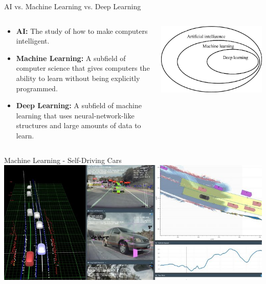 \documentclass[aspectratio=169]{beamer}
\begin{document}
\begin{frame}{AI vs. Machine Learning vs. Deep Learning}

    \begin{columns}
        \begin{column}{0.5\textwidth}
            \begin{itemize}
                \item \textbf{AI:} The study of how to make computers intelligent.
                \item \textbf{Machine Learning:} A subfield of computer science that gives computers the ability to learn without being explicitly programmed.
                \item \textbf{Deep Learning:} A subfield of machine learning that uses neural-network-like structures and large amounts of data to learn.
            \end{itemize}
        \end{column}
        \begin{column}{0.5\textwidth}
            \includegraphics[width=\textwidth]{imgs/ai_diagram.jpg}
        \end{column}
    \end{columns}

\end{frame}

\begin{frame}{Machine Learning - Self-Driving Cars}
    \includegraphics[width=\textwidth]{imgs/vis_6.jpg}
\end{frame}
\end{document}
